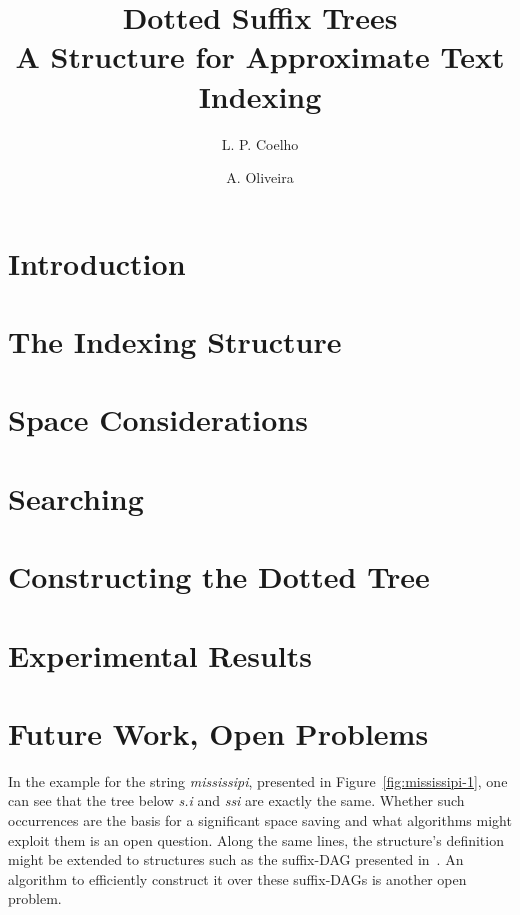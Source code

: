 \documentclass[a4paper,10pt]{article}
\title{Dotted Suffix Trees\\A Structure for Approximate Text Indexing}
\author{L. P. Coelho \and A. Oliveira}
\newcommand{\putstring}[1]{\textsl{#1}}
\begin{document}
\maketitle

\begin{abstract}

\end{abstract}

\section{Introduction}


\section{The Indexing Structure}

\section{Space Considerations}

\section{Searching}

\section{Constructing the Dotted Tree}

\section{Experimental Results}

\section{Future Work, Open Problems}

In the example for the string \putstring{mississipi}, presented in Figure~\ref{fig:mississipi-1}, one can see that the tree below \putstring{s.i} and \putstring{ssi} are exactly the same. Whether such occurrences are the basis for a significant space saving and what algorithms might exploit them is an open question.
Along the same lines, the structure's definition might be extended to structures such as the suffix-DAG presented in~\cite[7.7]{gusfield:algorithms}. An algorithm to efficiently construct it over these suffix-DAGs is another open problem.



\end{document}
